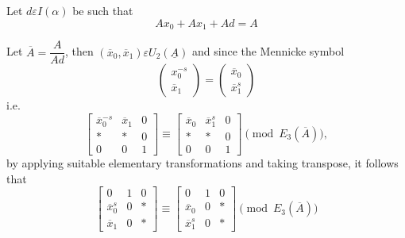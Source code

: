 \begin{Proof}
Let $d\varepsilon I(\alpha)$ be such that 
$$
Ax_0+Ax_1+Ad=A
$$

Let $\overline{A}=\dfrac{A}{Ad}$, then
$\left(\overline{x}_0,\overline{x}_1\right)\varepsilon
U_2(\underline{A})$ and since the Mennicke symbol
$$
\begin{pmatrix}
x^{-s}_0\\
\overline{x}_1
\end{pmatrix} = \begin{pmatrix}
\overline{x}_0\\
\overline{x}^{s}_1
\end{pmatrix}
$$
i.e.
$$
\begin{bmatrix}
\overline{x}^{-s}_0 & \overline{x}_1 & 0\\
\ast & \ast & 0\\
0 & 0 & 1 
\end{bmatrix} \equiv \begin{bmatrix}
\overline{x}_0 & \overline{x}^{s}_1 & 0\\
\ast & \ast & 0\\
0 & 0 & 1
\end{bmatrix} \pmod{E_3(\overline{A})},
$$
by applying suitable elementary transformations and taking transpose,
it follows that 
$$
\begin{bmatrix}
0 & 1 & 0\\
\overline{x}^{s}_0 & 0 & \ast\\
\overline{x}_1 & 0 & \ast
\end{bmatrix} \equiv \begin{bmatrix}
0 & 1 & 0\\
\overline{x}_0 & 0 & \ast\\
\overline{x}^{s}_1 & 0 & \ast
\end{bmatrix} \pmod{E_3(\overline{A})}
$$


\end{Proof}

